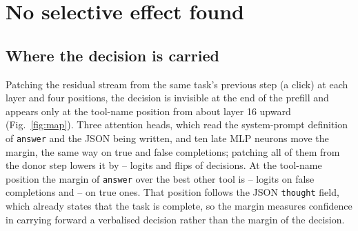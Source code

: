 \section{No selective effect found}
\label{nsec:interv}
\subsection{Where the decision is carried}
\label{nsec:where}
Patching the residual stream from the same task's previous step (a click) at each layer and four positions, the decision is invisible at the end of the prefill and appears only at the tool-name position from about layer 16 upward (Fig.~\ref{fig:map}). Three attention heads, which read the system-prompt definition of \texttt{answer} and the JSON being written, and ten late MLP neurons move the margin, the same way on true and false completions; patching all of them from the donor step lowers it by \cjDeltaMin--\cjDeltaMax{} logits and flips \cjFlips{} of \cjN{} decisions. At the tool-name position the margin of \texttt{answer} over the best other tool is \margPosMin--\margPosMax{} logits on false completions and \margNegMin--\margNegMax{} on true ones. That position follows the JSON \texttt{thought} field, which already states that the task is complete, so the margin measures confidence in carrying forward a verbalised decision rather than the margin of the decision.

